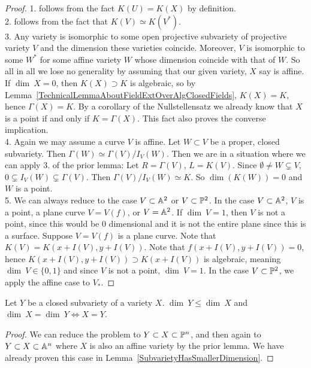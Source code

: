         \begin{proof}
            1. follows from the fact $K(U)=K(X)$ by definition.\\ 
            2. follows from the fact that $K(V)\simeq K(V^\ast)$.\\
            3.  Any variety is isomorphic to some open projective subvariety of projective variety $V$ and the dimension these varieties coincide. Moreover, $V$ is isomorphic to some $W^\ast$ for some affine variety $W$ whose dimension coincide with that of $W$. So all in all we lose no generality by assuming that our given variety, $X$ say is affine.\\ 
            If $\dim\ X = 0$, then $K(X)\supset K$ is algebraic, so by Lemma~\ref{TechnicalLemmaAboutFieldExtOverAlgClosedFields}, $K(X)=K$, hence $\Gamma(X)= K$. By a corollary of the Nullstellensatz we already know that $X$ is a point if and only if $K=\Gamma(X)$. This fact also proves the converse implication.\\
            4. Again we may assume a curve $V$ is affine. Let $W\subset V$ be a proper, closed subvariety. Then $\Gamma(W)\simeq \Gamma(V)/I_V(W)$. Then we are in a situation where we can apply 3. of the prior lemma: Let $R=\Gamma(V)$, $L=K(V)$. Since $\emptyset \neq W\subsetneq V$, $0\subsetneq I_V(W)\subsetneq \Gamma(V)$. Then $\Gamma(V)/I_V(W)\simeq K$. So $\dim(K(W))=0$ and $W$ is a point.\\
            5. We can always reduce to the case $V\subset \mathbb{A}^2$ or $V\subset \mathbb{P}^2$. In the case $V\subset \mathbb{A}^2$, $V$ is a point, a plane curve $V=V(f)$, or $V=\mathbb{A}^2$. If $\dim \ V = 1$, then $V$ is not a point, since this would be $0$ dimensional and it is not the entire plane since this is a surface. Suppose $V=V(f)$ is a plane curve. Note that $K(V)=K(x+I(V),y+I(V))$. Note that $f(x+I(V),y+I(V))=0$, hence $K(x+I(V),y+I(V))\supset K(x+I(V))$ is algebraic, meaning $\dim \ V \in \{0,1\}$ and since $V$ is not a point, $\dim \ V =1$. In the case $V\subset \mathbb{P}^2$, we apply the affine case to $V_\ast$.  
        \end{proof}
        \begin{proposition}
            Let $Y$ be a closed subvariety of a variety $X$. $\dim \ Y \leq \dim \ X$ and $\dim\ X = \dim \ Y \iff X=Y$.
        \end{proposition}
        \begin{proof}
            We can reduce the problem to $Y\subset X\subset \mathbb{P}^n$, and then again to $Y\subset X \subset \mathbb{A}^n$ where $X$ is also an affine variety by the prior lemma. We have already proven this case in Lemma~\ref{SubvarietyHasSmallerDimension}.
        \end{proof}
